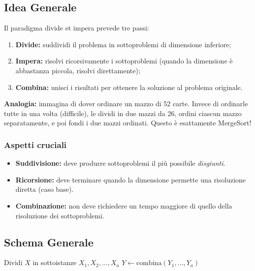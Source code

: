 \documentclass[a4paper, 11pt]{article}
\theoremstyle{definition}
\theoremstyle{remark}
\theoremstyle{remark}
\newenvironment{nota}{%
	\begin{tcolorbox}[
		colback=codebg,
		colframe=primary,
		fonttitle=\bfseries,
		title=Nota,
		left=6pt, right=6pt, top=4pt, bottom=4pt
		]
	}{%
	\end{tcolorbox}
}
\begin{document}
	\subsection{Idea Generale}
	
	Il paradigma divide et impera prevede tre passi:
	\begin{enumerate}
		\item \textbf{Divide:} suddividi il problema in sottoproblemi
		di dimensione inferiore;
		\item \textbf{Impera:} risolvi ricorsivamente i sottoproblemi
		(quando la dimensione è abbastanza piccola, risolvi
		direttamente);
		\item \textbf{Combina:} unisci i risultati per ottenere
		la soluzione al problema originale.
	\end{enumerate}
	
	\begin{nota}
		\textbf{Analogia:} immagina di dover ordinare un mazzo di 52 carte.
		Invece di ordinarle tutte in una volta (difficile), le dividi in
		due mazzi da 26, ordini ciascun mazzo separatamente, e poi fondi
		i due mazzi ordinati. Questo è esattamente MergeSort!
	\end{nota}
	
	\subsubsection*{Aspetti cruciali}
	
	\begin{itemize}
		\item \textbf{Suddivisione:} deve produrre sottoproblemi il più
		possibile \textit{disgiunti}.
		\item \textbf{Ricorsione:} deve terminare quando la dimensione
		permette una risoluzione diretta (caso base).
		\item \textbf{Combinazione:} non deve richiedere un tempo
		maggiore di quello della risoluzione dei sottoproblemi.
	\end{itemize}
	
	\subsection{Schema Generale}
	
	\begin{algorithm}[H]
		\caption{DivideEtImpera($X$)}
		Dividi $X$ in sottoistanze $X_1, X_2, \ldots, X_a$\;
		$Y \gets \text{combina}(Y_1, \ldots, Y_a)$\;
		\;
	\end{algorithm}
	
\end{document}
